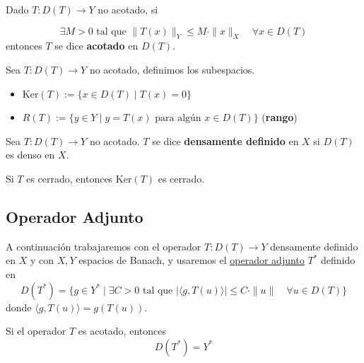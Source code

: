 \documentclass[12pt]{book}
\newcommand{\tbf}{\textbf}
\begin{document}
\begin{definicion}
    Dado $T: D(T) \to Y$ no acotado, si 
    
    \begin{equation*}
        \exists M > 0 \text{ tal que } \|T(x)\|_Y \leq M \cdot \|x\|_X \quad \forall x \in D(T)
    \end{equation*}
    entonces $T$ se dice \textbf{acotado} en $D(T)$.
\end{definicion}



\begin{definicion}
    Sea $T: D(T) \to Y$ no acotado, definimos los subespacios.
    \begin{itemize}
        \item $\text{Ker}(T) := \{ x \in D(T) \mid T(x) = 0 \}$
        \item $R(T) := \{ y \in Y \mid y = T(x) \text{ para algún } x \in D(T) \}$ (\tbf{rango})
    \end{itemize}
\end{definicion}

\begin{definicion}
    Sea $T: D(T) \to Y$ no acotado. $T$ se dice \tbf{densamente definido} en $X$ si $D(T)$ es denso en $X$. \\
\end{definicion}

\begin{prop}
    Si $T$ es cerrado, entonces $\text{Ker}(T)$ es cerrado.
\end{prop}

\subsection{Operador Adjunto}

\noindent
A continuación trabajaremos con el operador $T: D(T) \to Y$ densamente definido en $X$ y con $X, Y$ espacios de Banach, y usaremos el \underline{operador adjunto} $T^*$ definido en
\begin{equation*}
    D(T^*) = \{ g \in Y^* \mid \exists C > 0 \text{ tal que } |\langle g, T(u) \rangle| \le C \cdot \|u\| \quad \forall u \in D(T) \}
\end{equation*}
donde $\langle g, T(u) \rangle = g(T(u))$. \\

\begin{prop}
    Si el operador $T$ es acotado, entonces
    \begin{equation*}
        D(T^*) = Y^*
    \end{equation*}
\end{prop}
\end{document}
